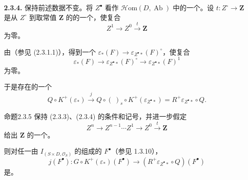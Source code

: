 \textbf{2.3.4.} 保持前述数据不变。将 $Z^\bullet$ 看作 $\mathscr{H}\mathrm{om}(D,\operatorname{Ab})$ 中的一个。设 $t:Z^\circ\to\mathbf Z$ 是从 $Z^\circ$ 到取常值 $\mathbf Z$ 的的一个，使复合
\[
Z^1\longrightarrow Z^0\xrightarrow{t}\mathbf Z \tag{2.3.4.1}
\]
为零。

由（参见 (2.3.1.1)），得到一个 $\varepsilon_*(F)\to\varepsilon_{Z^\bullet*}(F)^\circ$，使复合
\[
\varepsilon_*(F)\longrightarrow\varepsilon_{Z^\bullet*}(F)^\circ
\longrightarrow\varepsilon_{Z^\bullet*}(F)^1 \tag{2.3.4.2}
\]
为零。

于是存在的一个
\[
Q\circ K^+(\varepsilon_*)\xrightarrow{j}
Q\circ(\ )_s\circ K^+(\varepsilon_{Z^\bullet*})
=R^+\varepsilon_{Z^\bullet*}\circ Q. \tag{2.3.4.3}
\]
\begin{SGAresult}{命题}{2.3.5}
保持 (2.3.3)、(2.3.4) 的条件和记号，并进一步假定
\[
Z^n\longrightarrow Z^{n-1}\cdots Z^1\longrightarrow Z^0\xrightarrow{t}\mathbf Z
\]
给出 $\mathbf Z$ 的一个。

则对任一由 $I_{(S\times D,\mathcal O_S)}$ 的组成的 $F^\bullet$（参见 1.3.10），
\[
j(F^\bullet):G\circ K^+(\varepsilon_*)(F^\bullet)
\longrightarrow(R^+\varepsilon_{Z^\bullet*}\circ Q)(F^\bullet)
\]
是。
\end{SGAresult}
